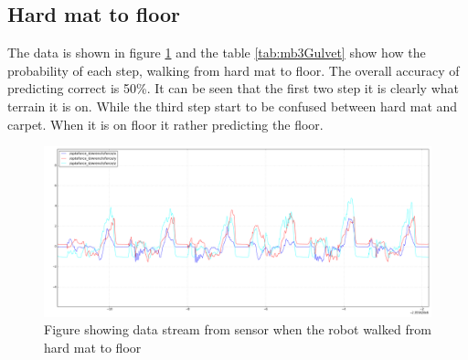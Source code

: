 \documentclass[USenglish]{ifimaster}  %
\begin{document}
\subsection{Hard mat to floor} \label{subsec:hmf}
The data is shown in figure \ref{fig:mb3Gulvet} and the table \ref{tab:mb3Gulvet} show how the probability of each step, walking from hard mat to floor. The overall accuracy of predicting correct is 50\%. It can be seen that the first two step it is clearly what terrain it is on. While the third step start to be confused between hard mat and carpet. When it is on floor it rather predicting the floor.



\begin{figure}[h]
    \centering
    \includegraphics[width=\textwidth,height=\textheight,keepaspectratio]{Figures/MB3_3_Gulvet}
    \caption{Figure showing data stream from sensor when the robot walked from hard mat to floor}
    \label{fig:mb3Gulvet}
\end{figure}


\begin{table}[h]
\centering
{}
\caption{The table showing probability of each terrain per step walking from hard mat to floor. Marked green represent correct prediction and correct terrain, red represent wrong prediction and yellow is the correct prediction if it got wrong.}
\label{tab:mb3Gulvet}
\end{table}
\end{document}
